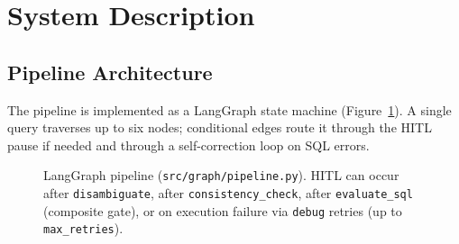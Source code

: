 \documentclass{article}
\begin{document}
\section{System Description}
\label{sec:system}

\subsection{Pipeline Architecture}

The pipeline is implemented as a LangGraph state machine (Figure~\ref{fig:pipeline}).
A single query traverses up to six nodes; conditional edges route it through
the HITL pause if needed and through a self-correction loop on SQL errors.

\begin{figure}[h]
  \centering
  \caption{LangGraph pipeline (\texttt{src/graph/pipeline.py}).  HITL can occur
    after \texttt{disambiguate}, after \texttt{consistency\_check}, after
    \texttt{evaluate\_sql} (composite gate), or on execution failure via
    \texttt{debug} retries (up to \texttt{max\_retries}).}
  \label{fig:pipeline}
\end{figure}
\end{document}
